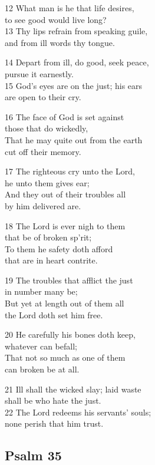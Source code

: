 12 What man is he that life desires,\\
to see good would live long?\\
13 Thy lips refrain from speaking guile,\\
and from ill words thy tongue.

14 Depart from ill, do good, seek peace,\\
pursue it earnestly.\\
15 God’s eyes are on the just; his ears\\
are open to their cry.

16 The face of God is set against\\
those that do wickedly,\\
That he may quite out from the earth\\
cut off their memory.

17 The righteous cry unto the Lord,\\
he unto them gives ear;\\
And they out of their troubles all\\
by him delivered are.

18 The Lord is ever nigh to them\\
that be of broken sp’rit;\\
To them he safety doth afford\\
that are in heart contrite.

19 The troubles that afflict the just\\
in number many be;\\
But yet at length out of them all\\
the Lord doth set him free.

20 He carefully his bones doth keep,\\
whatever can befall;\\
That not so much as one of them\\
can broken be at all.

21 Ill shall the wicked slay; laid waste\\
shall be who hate the just.\\
22 The Lord redeems his servants’ souls;\\
none perish that him trust.

\begin{center}
\quad{}\quad{}
\end{center}

\subsection*{Psalm 35}


